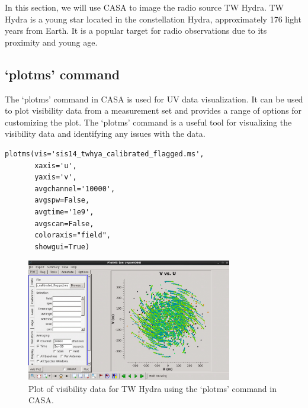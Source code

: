 In this section, we will use CASA to image the radio source TW Hydra. TW Hydra is a young star located in the constellation Hydra, approximately 176 light years from Earth. It is a popular target for radio observations due to its proximity and young age.

\subsection{`plotms' command}

The `plotms' command in CASA is used for UV data visualization. It can be used to plot visibility data from a measurement set and provides a range of options for customizing the plot. The `plotms' command is a useful tool for visualizing the visibility data and identifying any issues with the data.


\vspace{15mm}

\begin{lstlisting}[style=casa-python]
plotms(vis='sis14_twhya_calibrated_flagged.ms', 
       xaxis='u', 
       yaxis='v', 
       avgchannel='10000', 
       avgspw=False, 
       avgtime='1e9', 
       avgscan=False, 
       coloraxis="field", 
       showgui=True)
\end{lstlisting}

\begin{figure}[H]
	\centering
	\includegraphics[width=0.8\textwidth]{Images/uv.png}
	\caption{Plot of visibility data for TW Hydra using the `plotms' command in CASA.}
\end{figure}

